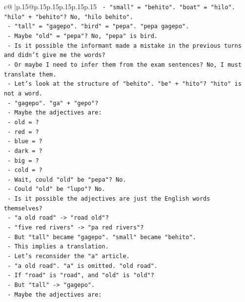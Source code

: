 \documentclass{article}
\begin{document}
{\begin{supertabular}{c@{$\;$}|p{.15\linewidth}@{}p{.15\linewidth}p{.15\linewidth}p{.15\linewidth}p{.15\linewidth}p{.15\linewidth}}
{{{\texttt{      {-} "small" = "behito". "boat" = "hilo". "hilo" + "behito"? No, "hilo behito".} \\
\texttt{      {-} "tall" = "gagepo". "bird" = "pepa". "pepa gagepo".} \\
\texttt{      {-} Maybe "old" = "pepa"? No, "pepa" is bird.} \\
\texttt{      {-} Is it possible the informant made a mistake in the previous turns and didn't give me the words?} \\
\texttt{      {-} Or maybe I need to infer them from the exam sentences? No, I must translate them.} \\
\texttt{      {-} Let's look at the structure of "behito". "be" + "hito"? "hito" is not a word.} \\
\texttt{      {-} "gagepo". "ga" + "gepo"?} \\
\texttt{      {-} Maybe the adjectives are:} \\
\texttt{        {-} old = ?} \\
\texttt{        {-} red = ?} \\
\texttt{        {-} blue = ?} \\
\texttt{        {-} dark = ?} \\
\texttt{        {-} big = ?} \\
\texttt{        {-} cold = ?} \\
\texttt{      {-} Wait, could "old" be "pepa"? No.} \\
\texttt{      {-} Could "old" be "lupo"? No.} \\
\texttt{      {-} Is it possible the adjectives are just the English words themselves?} \\
\texttt{        {-} "a old road" {-}> "road old"?} \\
\texttt{        {-} "five red rivers" {-}> "pa red rivers"?} \\
\texttt{      {-} But "tall" became "gagepo". "small" became "behito".} \\
\texttt{      {-} This implies a translation.} \\
\texttt{      {-} Let's reconsider the "a" article.} \\
\texttt{      {-} "a old road". "a" is omitted. "old road".} \\
\texttt{      {-} If "road" is "road", and "old" is "old"?} \\
\texttt{      {-} But "tall" {-}> "gagepo".} \\
\texttt{      {-} Maybe the adjectives are:} \\
}}}
\end{supertabular}}
\end{document}
